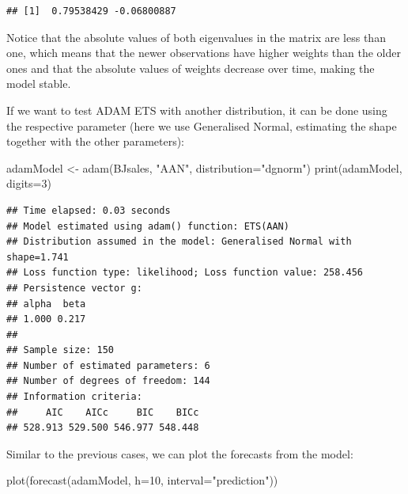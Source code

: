 \documentclass[
]{book}
\newenvironment{Shaded}{\begin{snugshade}}{\end{snugshade}}
\newcommand{\AttributeTok}[1]{\textcolor[rgb]{0.77,0.63,0.00}{#1}}
\newcommand{\DecValTok}[1]{\textcolor[rgb]{0.00,0.00,0.81}{#1}}
\newcommand{\FunctionTok}[1]{\textcolor[rgb]{0.00,0.00,0.00}{#1}}
\newcommand{\NormalTok}[1]{#1}
\newcommand{\OtherTok}[1]{\textcolor[rgb]{0.56,0.35,0.01}{#1}}
\newcommand{\StringTok}[1]{\textcolor[rgb]{0.31,0.60,0.02}{#1}}
\theoremstyle{definition}
\theoremstyle{definition}
\theoremstyle{definition}
\theoremstyle{definition}
\theoremstyle{remark}
\begin{document}
\begin{verbatim}
## [1]  0.79538429 -0.06800887
\end{verbatim}

Notice that the absolute values of both eigenvalues in the matrix are less than one, which means that the newer observations have higher weights than the older ones and that the absolute values of weights decrease over time, making the model stable.

If we want to test ADAM ETS with another distribution, it can be done using the respective parameter (here we use Generalised Normal, estimating the shape together with the other parameters):

\begin{Shaded}
\begin{Highlighting}[]
\NormalTok{adamModel }\OtherTok{\textless{}{-}} \FunctionTok{adam}\NormalTok{(BJsales, }\StringTok{"AAN"}\NormalTok{, }\AttributeTok{distribution=}\StringTok{"dgnorm"}\NormalTok{)}
\FunctionTok{print}\NormalTok{(adamModel, }\AttributeTok{digits=}\DecValTok{3}\NormalTok{)}
\end{Highlighting}
\end{Shaded}

\begin{verbatim}
## Time elapsed: 0.03 seconds
## Model estimated using adam() function: ETS(AAN)
## Distribution assumed in the model: Generalised Normal with shape=1.741
## Loss function type: likelihood; Loss function value: 258.456
## Persistence vector g:
## alpha  beta 
## 1.000 0.217 
## 
## Sample size: 150
## Number of estimated parameters: 6
## Number of degrees of freedom: 144
## Information criteria:
##     AIC    AICc     BIC    BICc 
## 528.913 529.500 546.977 548.448
\end{verbatim}

Similar to the previous cases, we can plot the forecasts from the model:

\begin{Shaded}
\begin{Highlighting}[]
\FunctionTok{plot}\NormalTok{(}\FunctionTok{forecast}\NormalTok{(adamModel, }\AttributeTok{h=}\DecValTok{10}\NormalTok{, }\AttributeTok{interval=}\StringTok{"prediction"}\NormalTok{))}
\end{Highlighting}
\end{Shaded}
\end{document}
